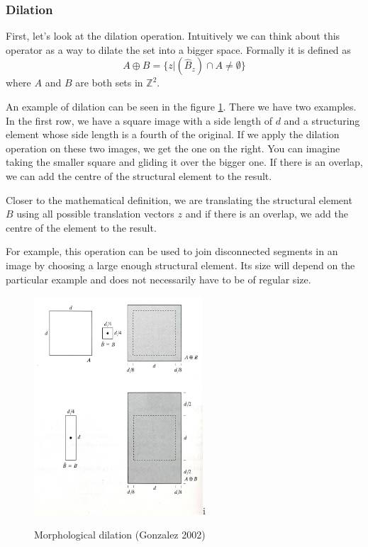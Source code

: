 \documentclass[
  digital,     %
  oneside,     %
  nosansbold,  %
  nocolorbold, %
  lof,         %
  lot,         %
]{fithesis4}
\newcommand*{\Z}{\ensuremath{\mathbb{Z}}}
\begin{document}
\subsubsection{Dilation}
First, let's look at the dilation operation. Intuitively we can think about this
operator as a way to dilate the set into a bigger space. Formally it is defined as
$$A \oplus B = \{z | (\hat{B}_z) \cap A \neq \emptyset\}$$
where $A$ and $B$ are both sets in $\Z^2$. 

An example of dilation can be seen in the figure
\ref{fig:morph_dilation}. There we have two examples. In the first row, we have
a square image with a side length of $d$ and a structuring element whose side length
is a fourth of the original. If we apply the dilation operation on these two
images, we get the one on the right. You can imagine taking the smaller square and
gliding it over the bigger one. If there is an overlap, we can add the centre of
the structural element to the result. 

Closer to the mathematical definition, we
are translating the structural element $B$ using all possible translation
vectors $z$ and if there is an overlap, we add the centre of the element to the
result.

For example, this operation can be used to join disconnected segments in an
image by choosing a large enough structural element. Its size will depend on the
particular example and does not necessarily have to be of regular size.

\begin{figure}
    \begin{center}
        \includegraphics[width=6.3cm]{resources/morph_dilation.jpg}i
    \end{center}
    \caption{Morphological dilation (Gonzalez 2002)} %
    \label{fig:morph_dilation}
\end{figure}
\end{document}
